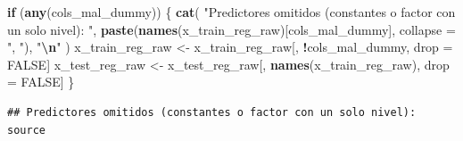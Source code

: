 \documentclass[
]{article}
\newenvironment{Shaded}{\begin{snugshade}}{\end{snugshade}}
\newcommand{\AttributeTok}[1]{\textcolor[rgb]{0.13,0.29,0.53}{#1}}
\newcommand{\ConstantTok}[1]{\textcolor[rgb]{0.56,0.35,0.01}{#1}}
\newcommand{\ControlFlowTok}[1]{\textcolor[rgb]{0.13,0.29,0.53}{\textbf{#1}}}
\newcommand{\FunctionTok}[1]{\textcolor[rgb]{0.13,0.29,0.53}{\textbf{#1}}}
\newcommand{\NormalTok}[1]{#1}
\newcommand{\OtherTok}[1]{\textcolor[rgb]{0.56,0.35,0.01}{#1}}
\newcommand{\SpecialCharTok}[1]{\textcolor[rgb]{0.81,0.36,0.00}{\textbf{#1}}}
\newcommand{\StringTok}[1]{\textcolor[rgb]{0.31,0.60,0.02}{#1}}
\begin{document}
\begin{Shaded}
\begin{Highlighting}[]
\ControlFlowTok{if}\NormalTok{ (}\FunctionTok{any}\NormalTok{(cols\_mal\_dummy)) \{}
  \FunctionTok{cat}\NormalTok{(}
    \StringTok{"Predictores omitidos (constantes o factor con un solo nivel): "}\NormalTok{,}
    \FunctionTok{paste}\NormalTok{(}\FunctionTok{names}\NormalTok{(x\_train\_reg\_raw)[cols\_mal\_dummy], }\AttributeTok{collapse =} \StringTok{", "}\NormalTok{),}
    \StringTok{"}\SpecialCharTok{\textbackslash{}n}\StringTok{"}
\NormalTok{  )}
\NormalTok{  x\_train\_reg\_raw }\OtherTok{\textless{}{-}}\NormalTok{ x\_train\_reg\_raw[, }\SpecialCharTok{!}\NormalTok{cols\_mal\_dummy, drop }\OtherTok{=} \ConstantTok{FALSE}\NormalTok{]}
\NormalTok{  x\_test\_reg\_raw }\OtherTok{\textless{}{-}}\NormalTok{ x\_test\_reg\_raw[, }\FunctionTok{names}\NormalTok{(x\_train\_reg\_raw), drop }\OtherTok{=} \ConstantTok{FALSE}\NormalTok{]}
\NormalTok{\}}
\end{Highlighting}
\end{Shaded}

\begin{verbatim}
## Predictores omitidos (constantes o factor con un solo nivel):  source
\end{verbatim}
\end{document}
